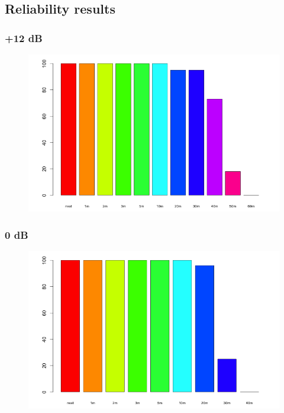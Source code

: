 

\subsection{Reliability results}

\subsubsection{+12 dB}

\begin{figure}[H]
  \centering
  \includegraphics[width=1.0\textwidth]{img/tests/range/db_12.png}
\end{figure}


\subsubsection{0 dB}

\begin{figure}[H]
  \centering
  \includegraphics[width=1.0\textwidth]{img/tests/range/db_00.png}
\end{figure}

